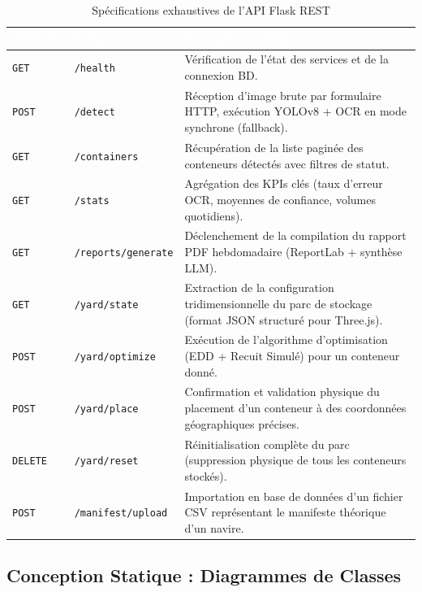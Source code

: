 \documentclass[12pt,a4paper]{article}
\begin{document}
\begin{table}[H]
\centering
\caption{Spécifications exhaustives de l'API Flask REST}
\begin{tabular}{|l|p{4cm}|p{7.5cm}|}
\hline
\rowcolor{TableHeader}\textcolor{white}{\textbf{Méthode}} & \textcolor{white}{\textbf{Endpoint}} & \textcolor{white}{\textbf{Description / Rôle}} \\ \hline
\texttt{GET} & \texttt{/health} & Vérification de l'état des services et de la connexion BD.\\ \hline
\texttt{POST} & \texttt{/detect} & Réception d'image brute par formulaire HTTP, exécution YOLOv8 + OCR en mode synchrone (fallback).\\ \hline
\texttt{GET} & \texttt{/containers} & Récupération de la liste paginée des conteneurs détectés avec filtres de statut.\\ \hline
\texttt{GET} & \texttt{/stats} & Agrégation des KPIs clés (taux d'erreur OCR, moyennes de confiance, volumes quotidiens).\\ \hline
\texttt{GET} & \texttt{/reports/generate} & Déclenchement de la compilation du rapport PDF hebdomadaire (ReportLab + synthèse LLM).\\ \hline
\texttt{GET} & \texttt{/yard/state} & Extraction de la configuration tridimensionnelle du parc de stockage (format JSON structuré pour Three.js).\\ \hline
\texttt{POST} & \texttt{/yard/optimize} & Exécution de l'algorithme d'optimisation (EDD + Recuit Simulé) pour un conteneur donné.\\ \hline
\texttt{POST} & \texttt{/yard/place} & Confirmation et validation physique du placement d'un conteneur à des coordonnées géographiques précises.\\ \hline
\texttt{DELETE} & \texttt{/yard/reset} & Réinitialisation complète du parc (suppression physique de tous les conteneurs stockés).\\ \hline
\texttt{POST} & \texttt{/manifest/upload} & Importation en base de données d'un fichier CSV représentant le manifeste théorique d'un navire.\\ \hline
\end{tabular}
\label{tab:api_endpoints}
\end{table}

\subsection{Conception Statique : Diagrammes de Classes}
\end{document}
